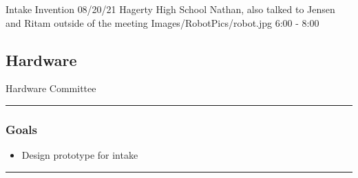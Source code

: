 \insertmeeting 
	{Intake Invention} 
	{08/20/21}
	{Hagerty High School}
	{Nathan, also talked to Jensen and Ritam outside of the meeting}
	{Images/RobotPics/robot.jpg}
	{6:00 - 8:00}
	
\subsection*{Hardware}
\begin{bclogo}[couleur=blue!30, arrondi=0.2, logo=\bccrayon]{Hardware Committee}
\end{bclogo}
\noindent\hfil\rule{\textwidth}{.4pt}\hfil
\subsubsection*{Goals}
\begin{itemize}
    \item Design prototype for intake

\end{itemize} 

\noindent\hfil\rule{\textwidth}{.4pt}\hfil

